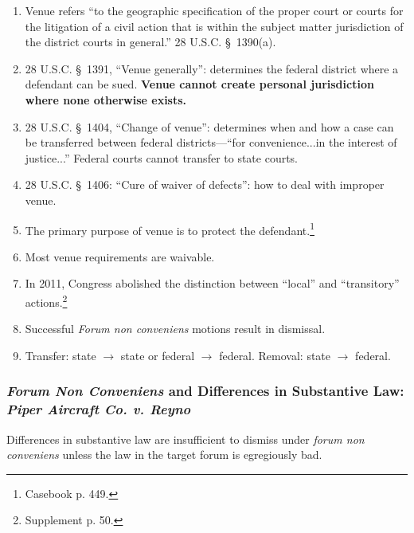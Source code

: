\begin{enumerate}
    \item Venue refers ``to the geographic specification of the proper court 
    or courts for the litigation of a civil action that is within the subject 
    matter jurisdiction of the district courts in general.'' 28 U.S.C. \S\ 
    1390(a).
    \item 28 U.S.C. \S\ 1391, ``Venue generally'': determines the federal 
    district where a defendant can be sued. \textbf{Venue cannot create 
    personal jurisdiction where none otherwise exists.}
    \item 28 U.S.C. \S\ 1404, ``Change of venue'': determines when and how a 
    case can be transferred between federal districts---``for convenience...in 
    the interest of justice...'' Federal courts cannot transfer to state 
    courts.
    \item 28 U.S.C. \S\ 1406: ``Cure of waiver of defects'': how to deal with 
    improper venue.
    \item The primary purpose of venue is to protect the 
    defendant.\footnote{Casebook p. 449.}
    \item Most venue requirements are waivable.
    \item In 2011, Congress abolished the distinction between ``local'' and 
    ``transitory'' actions.\footnote{Supplement p. 50.}
    \item Successful \emph{Forum non conveniens} motions result in dismissal.
    \item Transfer: state $\rightarrow$ state or federal $\rightarrow$ 
    federal. Removal: state $\rightarrow$ federal.
\end{enumerate}

\subsubsection{\emph{Forum Non Conveniens} and Differences in Substantive Law: 
\emph{Piper Aircraft Co. v. Reyno}}

Differences in substantive law are insufficient to dismiss under \emph{forum 
non conveniens} unless the law in the target forum is egregiously bad.

